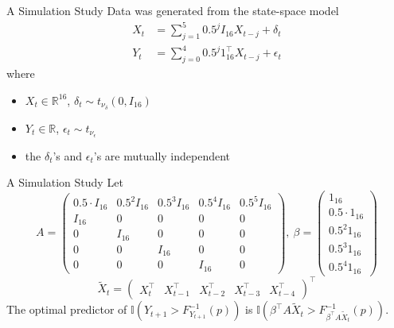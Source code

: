 \documentclass{beamer}
\def\I{\mathbb I}
\def\R{\mathbb R}
\begin{document}
\begin{frame}{A Simulation Study}
    Data was generated from the state-space model
    \begin{align*}
        X_t &= \sum_{j = 1}^5 0.5^j I_{16}X_{t - j} + \delta_t \\
        Y_t &= \sum_{j = 0}^4 0.5^j 1_{16}^{\top}X_{t - j} + \epsilon_t
    \end{align*}
    where
    \begin{itemize}
        \item $X_t \in \R^{16}$, $\delta_t \sim t_{\nu_{\delta}}(0, I_{16})$
        \item $Y_t \in \R$, $\epsilon_t \sim t_{\nu_{\epsilon}}$
        \item the $\delta_t$'s and $\epsilon_t$'s are mutually independent
    \end{itemize}
\end{frame}

\begin{frame}{A Simulation Study}
    Let 
    \[
    A =
    \left(
    \begin{matrix}
        0.5 \cdot I_{16} & 0.5^2 I_{16} & 0.5^3 I_{16} & 0.5^4 I_{16} & 0.5^5 I_{16} \\
        I_{16} & 0 & 0 & 0 & 0 \\
        0 & I_{16} & 0 & 0 & 0 \\
        0 & 0 & I_{16} & 0 & 0 \\
        0 & 0 & 0 & I_{16} & 0
    \end{matrix}
    \right), \
    \beta =
    \left(
    \begin{matrix}
        1_{16} \\
        0.5 \cdot 1_{16} \\
        0.5^2 1_{16} \\
        0.5^3 1_{16} \\
        0.5^4 1_{16}
    \end{matrix}
    \right)
    \]
    \[
    \tilde{X}_t = 
    \left(
    \begin{matrix}
        X_t^{\top} & X_{t - 1}^{\top} & X_{t - 2}^{\top} & X_{t - 3}^{\top} & X_{t - 4}^{\top}
    \end{matrix}
    \right)^{\top}
    \]
    The optimal predictor of $\I(Y_{t + 1} > F_{Y_{t + 1}}^{-1}(p))$ is $\I(\beta^{\top} A\tilde{X}_t > F_{\beta^{\top} A\tilde{X}_t}^{-1}(p))$.
\end{frame}
\end{document}
